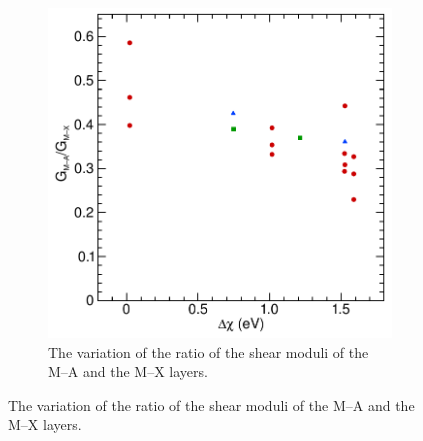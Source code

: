 \begin{figure}
\begin{subfigure}{0.4\textwidth}
\includegraphics[width=\textwidth]{Gma_Gmx_vs_dX}
\caption{The variation of the ratio of the shear moduli of the M--A and the M--X layers. \label{fig:ratio_of_Gma_to_Gmx}}
\end{subfigure}


\end{figure}
